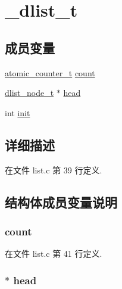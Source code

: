 \hypertarget{struct__dlist__t}{}\section{\+\_\+dlist\+\_\+t}
\label{struct__dlist__t}
\subsection*{成员变量}
\begin{DoxyCompactItemize}
\item 
\hyperlink{config_8h_a0d043bbb6b8db19fea54ab9271d352b6}{atomic\+\_\+counter\+\_\+t} \hyperlink{struct__dlist__t_a926495c47cb49881baea96f739cc6da5}{count}
\item 
\hyperlink{config_8h_a62053232bcf3566010ef98a7d77c3cc8}{dlist\+\_\+node\+\_\+t} $\ast$ \hyperlink{struct__dlist__t_a7640984dab27ed8fd4104971cdacef7e}{head}
\item 
int \hyperlink{struct__dlist__t_a795ea50921b36311ffd5e7baa2ef1f7e}{init}
\end{DoxyCompactItemize}


\subsection{详细描述}


在文件 list.\+c 第 39 行定义.



\subsection{结构体成员变量说明}
\hypertarget{struct__dlist__t_a926495c47cb49881baea96f739cc6da5}{}
\subsubsection[{count}]{ count}\label{struct__dlist__t_a926495c47cb49881baea96f739cc6da5}


在文件 list.\+c 第 41 行定义.

\hypertarget{struct__dlist__t_a7640984dab27ed8fd4104971cdacef7e}{}
\subsubsection[{head}]{$\ast$ head}\label{struct__dlist__t_a7640984dab27ed8fd4104971cdacef7e}


